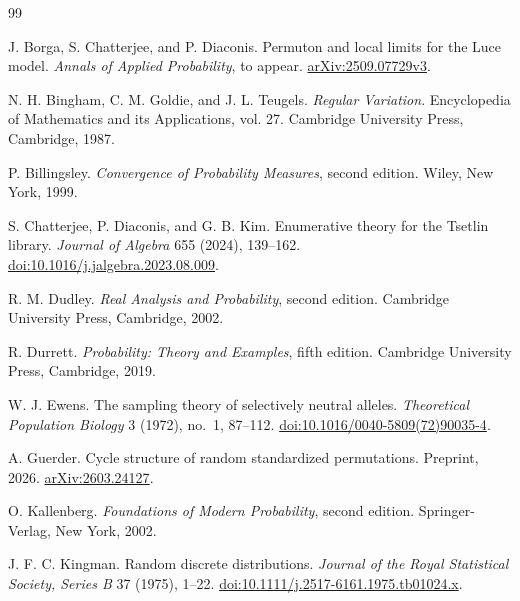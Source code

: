 \documentclass[11pt]{article}
\theoremstyle{definition}
\theoremstyle{remark}
\begin{document}
\begin{thebibliography}{99}

J. Borga, S. Chatterjee, and P. Diaconis.
\newblock Permuton and local limits for the Luce model.
\newblock \emph{Annals of Applied Probability}, to appear.
\newblock \href{https://arxiv.org/abs/2509.07729v3}{arXiv:2509.07729v3}.

N. H. Bingham, C. M. Goldie, and J. L. Teugels.
\newblock \emph{Regular Variation}.
\newblock Encyclopedia of Mathematics and its Applications, vol. 27.
\newblock Cambridge University Press, Cambridge, 1987.

P. Billingsley.
\newblock \emph{Convergence of Probability Measures}, second edition.
\newblock Wiley, New York, 1999.

S. Chatterjee, P. Diaconis, and G. B. Kim.
\newblock Enumerative theory for the Tsetlin library.
\newblock \emph{Journal of Algebra} 655 (2024), 139--162.
\newblock \href{https://doi.org/10.1016/j.jalgebra.2023.08.009}
{doi:10.1016/j.jalgebra.2023.08.009}.

R. M. Dudley.
\newblock \emph{Real Analysis and Probability}, second edition.
\newblock Cambridge University Press, Cambridge, 2002.

R. Durrett.
\newblock \emph{Probability: Theory and Examples}, fifth edition.
\newblock Cambridge University Press, Cambridge, 2019.

W. J. Ewens.
\newblock The sampling theory of selectively neutral alleles.
\newblock \emph{Theoretical Population Biology} 3 (1972), no.~1, 87--112.
\newblock \href{https://doi.org/10.1016/0040-5809(72)90035-4}
{doi:10.1016/0040-5809(72)90035-4}.

A. Guerder.
\newblock Cycle structure of random standardized permutations.
\newblock Preprint, 2026.
\newblock \href{https://arxiv.org/abs/2603.24127}{arXiv:2603.24127}.

O. Kallenberg.
\newblock \emph{Foundations of Modern Probability}, second edition.
\newblock Springer-Verlag, New York, 2002.

J. F. C. Kingman.
\newblock Random discrete distributions.
\newblock \emph{Journal of the Royal Statistical Society, Series B}
37 (1975), 1--22.
\newblock \href{https://doi.org/10.1111/j.2517-6161.1975.tb01024.x}
{doi:10.1111/j.2517-6161.1975.tb01024.x}.


\end{thebibliography}
\end{document}
